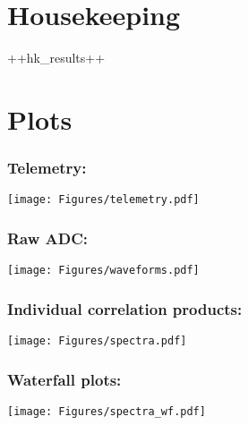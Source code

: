 \section{Housekeeping}

++hk_results++

\section{Plots}

\subsubsection*{Telemetry:}
\texttt{[image: Figures/telemetry.pdf]}


\subsubsection*{Raw ADC:}
\texttt{[image: Figures/waveforms.pdf]}


\subsubsection*{Individual correlation products:}
\texttt{[image: Figures/spectra.pdf]}

\newpage
\subsubsection*{Waterfall plots:}
\texttt{[image: Figures/spectra\_wf.pdf]}


